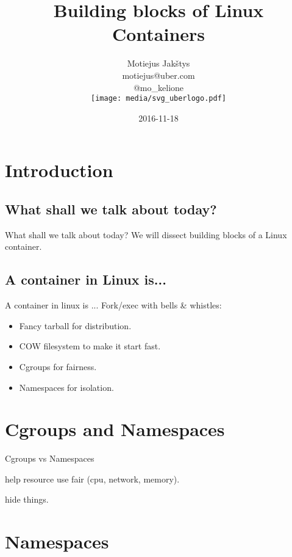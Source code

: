 \documentclass[14pt]{beamer}
\title{Building blocks of Linux Containers}
\author{Motiejus Jak\v{s}tys \\
    motiejus@uber.com \\
    @mo\_kelione \\
    \vspace{1em}
    \texttt{[image: media/svg\_uberlogo.pdf]}
}
\date{2016-11-18}
\begin{document}

\begin{frame}
\titlepage
\end{frame}

\section{Introduction}
\subsection{What shall we talk about today?}
\begin{frame}{What shall we talk about today?}
    We will dissect building blocks of a Linux container.
\end{frame}

\subsection{A container in Linux is...}
\begin{frame}{A container in linux is ...}
    Fork/exec with bells \& whistles:
    \begin{itemize}[<+(1)->]
        \item Fancy tarball for distribution.
        \item COW filesystem to make it start fast.
        \item Cgroups for fairness.
        \item Namespaces for isolation.
    \end{itemize}
\end{frame}

\section{Cgroups and Namespaces}
\begin{frame}{Cgroups vs Namespaces}
    \begin{description}[<+(1)->]
        \item[cgroups] help resource use fair (cpu, network, memory).
        \item[namespaces] hide things.
    \end{description}
\end{frame}

\section{Namespaces}
\end{document}
